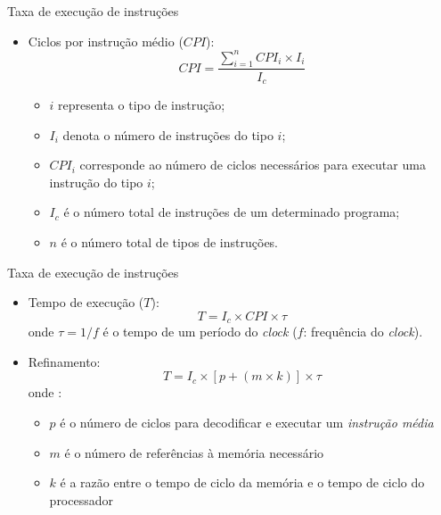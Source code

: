 \begin{slide}{Taxa de execução de instruções}
\begin{itemize}
   \item Ciclos por instrução médio ($CPI$):
   \begin{equation}
       CPI = \frac{\sum_{i = 1}^{n} CPI_i\times I_i}{I_c}
   \end{equation}
   \begin{itemize}
      \item $i$ representa o tipo de instrução; 
      \item $I_i$ denota o número de instruções do tipo $i$; 
      \item $CPI_i$ corresponde ao número de ciclos necessários para executar uma instrução do tipo $i$; 
      \item $I_c$ é o número total de instruções de um determinado programa; 
      \item $n$ é o número total de tipos de instruções.
   \end{itemize}
\end{itemize}
\end{slide}

\begin{slide}{Taxa de execução de instruções}
\begin{itemize}
	\item Tempo de execução ($T$):
		\begin{equation*}
			T = I_c \times CPI\times \tau
		\end{equation*}
		onde $\tau = 1/f$ é o tempo de um período do \emph{clock} ($f$: frequência do \emph{clock}).
	\item Refinamento:
		\begin{equation*}
			T = I_c \times \left [ p + \left ( m\times k \right )\right ]\times \tau
		\end{equation*}
		onde :
		\begin{itemize}
			\item $p$ é o número de ciclos para decodificar e executar um \emph{instrução média} 
			\item $m$ é o número de referências à memória necessário 
			\item $k$ é a razão entre o tempo de ciclo da memória e o tempo de ciclo do processador 
		\end{itemize}
\end{itemize}
\end{slide}

